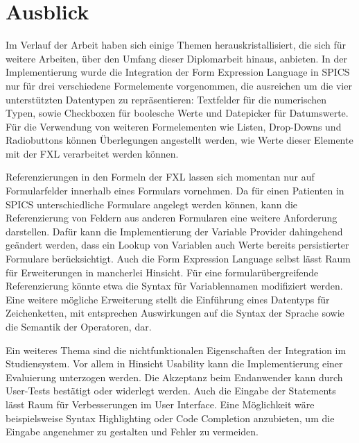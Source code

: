\chapter{Ausblick}
\label{chapter_ausblick}

Im Verlauf der Arbeit haben sich einige Themen herauskristallisiert, die sich für weitere Arbeiten, über den Umfang dieser Diplomarbeit hinaus, anbieten. In der Implementierung wurde die Integration der Form Expression Language in SPICS nur für drei verschiedene Formelemente vorgenommen, die ausreichen um die vier unterstützten Datentypen zu repräsentieren: Textfelder für die numerischen Typen, sowie Checkboxen für boolesche Werte und Datepicker für Datumswerte. Für die Verwendung von weiteren Formelementen wie Listen, Drop-Downs und Radiobuttons können Überlegungen angestellt werden, wie Werte dieser Elemente mit der FXL verarbeitet werden können.

Referenzierungen in den Formeln der FXL lassen sich momentan nur auf Formularfelder innerhalb eines Formulars vornehmen. Da für einen Patienten in SPICS unterschiedliche Formulare angelegt werden können, kann die Referenzierung von Feldern aus anderen Formularen eine weitere Anforderung darstellen. Dafür kann die Implementierung der Variable Provider dahingehend geändert werden, dass ein Lookup von Variablen auch Werte bereits persistierter Formulare berücksichtigt. Auch die Form Expression Language selbst lässt Raum für Erweiterungen in mancherlei Hinsicht. Für eine formularübergreifende Referenzierung könnte etwa die Syntax für Variablennamen modifiziert werden. Eine weitere mögliche Erweiterung stellt die Einführung eines Datentyps für Zeichenketten, mit entsprechen Auswirkungen auf die Syntax der Sprache sowie die Semantik der Operatoren, dar.

Ein weiteres Thema sind die nichtfunktionalen Eigenschaften der Integration im Studiensystem. Vor allem in Hinsicht Usability kann die Implementierung einer Evaluierung unterzogen werden. Die Akzeptanz beim Endanwender kann durch User-Tests bestätigt oder widerlegt werden. Auch die Eingabe der Statements lässt Raum für Verbesserungen im User Interface. Eine Möglichkeit wäre beispielsweise Syntax Highlighting oder Code Completion anzubieten, um die Eingabe angenehmer zu gestalten und Fehler zu vermeiden. 